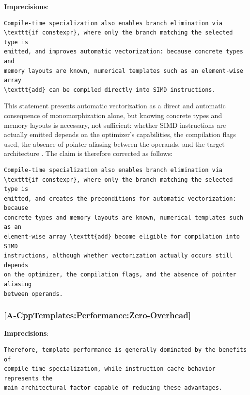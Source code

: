 \documentclass[11pt]{report}
\begin{document}
\noindent\textbf{Imprecisions}:

\begin{Verbatim}[breaklines=true]
Compile-time specialization also enables branch elimination via
\texttt{if constexpr}, where only the branch matching the selected type is
emitted, and improves automatic vectorization: because concrete types and
memory layouts are known, numerical templates such as an element-wise array
\texttt{add} can be compiled directly into SIMD instructions.
\end{Verbatim}

This statement presents automatic vectorization as a direct and automatic
consequence of monomorphization alone, but knowing concrete types and memory
layouts is necessary, not sufficient: whether SIMD instructions are actually
emitted depends on the optimizer's capabilities, the compilation flags used,
the absence of pointer aliasing between the operands, and the target
architecture \cite{llvm_langref}. The claim is therefore corrected as follows:

\begin{Verbatim}[breaklines=true]
Compile-time specialization also enables branch elimination via
\texttt{if constexpr}, where only the branch matching the selected type is
emitted, and creates the preconditions for automatic vectorization: because
concrete types and memory layouts are known, numerical templates such as an
element-wise array \texttt{add} become eligible for compilation into SIMD
instructions, although whether vectorization actually occurs still depends
on the optimizer, the compilation flags, and the absence of pointer aliasing
between operands.
\end{Verbatim}

\subsubsection*{\hyperref[A-CppTemplates:Performance:Zero-Overhead]{\ref*{A-CppTemplates:Performance:Zero-Overhead} }}
\noindent\textbf{Imprecisions}:

\begin{Verbatim}[breaklines=true]
Therefore, template performance is generally dominated by the benefits of
compile-time specialization, while instruction cache behavior represents the
main architectural factor capable of reducing these advantages.
\end{Verbatim}
\end{document}

